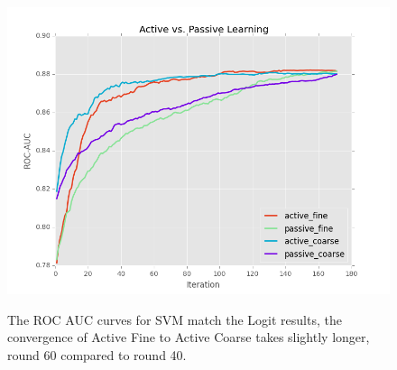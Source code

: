 \documentclass[ms]{nuthesis}
\begin{document}
\FloatBarrier
\begin{figure}[!htb]
	\centering
    \includegraphics[width=1.0\columnwidth]{fig/runActPassSVM_roc}
    \label{fig:ActiveVsPassiveROCSVM}
    \caption{The ROC AUC curves for SVM match the Logit results, the convergence of
     Active Fine to Active Coarse takes slightly longer, round 60 compared to round 40.}
\end{figure}
\FloatBarrier


%


\clearpage
\end{document}
